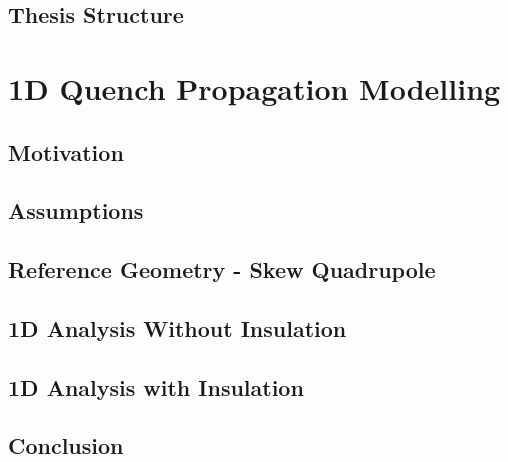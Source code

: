 \documentclass[11pt,a4paper]{report}
\begin{document}
\section{Thesis Structure}


\clearpage
\chapter{1D Quench Propagation Modelling}
\label{chapter: 1d_quench_propagation_modelling}

\section{Motivation}
\label{section: 1d_quench_propagation_motivation}


\section{Assumptions}
\label{section: 1d_quench_propagation_assumptions}


\section{Reference Geometry - Skew Quadrupole}
\label{section: 1d_quench_propagation_geometry}


\section{1D Analysis Without Insulation}

\label{section: 1D_quench_propagation_no_insulation}


\section{1D Analysis with Insulation}

\label{section: 1D_quench_propagation_with_insulation}


\section{Conclusion}
\label{section: 1D_quench_propagation_conclusions}

 
\end{document}

